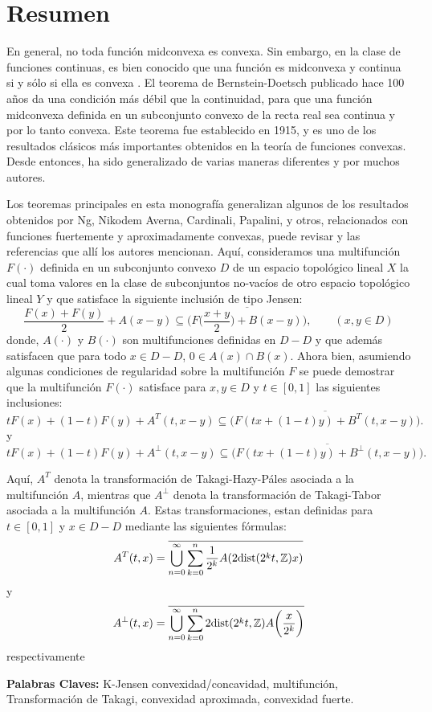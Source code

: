 \chapter*{Resumen}


En general, no toda función midconvexa es convexa. Sin embargo, en la clase de  
funciones continuas, es bien conocido que una función es midconvexa y continua si 
y sólo si ella es convexa \cite{Kuc09}. El teorema de Bernstein-Doetsch publicado hace 100 años da una condición
más débil que la continuidad, para que una función midconvexa definida en un subconjunto
convexo de la recta real sea continua y por lo tanto convexa. 
Este teorema fue establecido en 1915, y es uno de los resultados clásicos más importantes 
obtenidos en la teoría de funciones convexas. Desde entonces, ha sido generalizado de varias 
maneras diferentes y por muchos autores. 

Los teoremas principales en esta monografía generalizan algunos de los resultados obtenidos por Ng, Nikodem
Averna, Cardinali, Papalini, y otros, relacionados con funciones fuertemente y aproximadamente convexas,
puede revisar \cite{MakPal10b,MakPal13b,Nik89} y las referencias que allí los autores mencionan.
Aquí, consideramos una multifunción $F(\cdot)$ definida en un subconjunto convexo $D$ de
un espacio topológico lineal $X$ la cual toma valores en la clase de subconjuntos no-vacíos 
de otro espacio topológico lineal $Y$ y que satisface la siguiente inclusión de tipo Jensen:
$$
\frac{F(x)+F(y)}2 + A(x-y) \subseteq \overline{\bigg(F\bigg(\frac{x+y}2\bigg)+B(x-y)\bigg)},
\qquad
(x,y\in D)
$$
donde, $A(\cdot)$ y $B(\cdot)$ son multifunciones definidas en $D-D$ y que además satisfacen que para todo $x\in D-D$,
$0\in A(x)\cap B(x)$. Ahora bien, asumiendo algunas condiciones de regularidad sobre la multifunción $F$  
se puede demostrar que la multifunción $F(\cdot)$ satisface para $x,y\in D$ y $t\in[0,1]$
las siguientes inclusiones:
$$
tF(x)+(1-t)F(y) + A^T(t,x-y) \subseteq \overline{\bigg(F(tx+(1-t)y)+B^T(t,x-y)\bigg)}.
$$
y
$$
tF(x)+(1-t)F(y) + A^\perp(t,x-y) \subseteq \overline{\bigg(F(tx+(1-t)y)+B^\perp(t,x-y)\bigg)}.
$$

Aquí, $A^T$ denota la transformación de Takagi-Hazy-P\'ales asociada a la multifunción $A$, 
mientras que $A^\perp$ denota la transformaci\'on de Takagi-Tabor asociada a la multifunci\'on
$A$. Estas transformaciones, estan definidas para 
 $t\in[0,1]$ y $x\in D- D$ mediante las siguientes fórmulas:
$$
A^T(t,x) = \overline{\bigcup_{n=0}^{\infty}\sum_{k=0}^n{\frac1{2^k}A(2\mbox{dist}(2^kt,\mathbb{Z})x)}}
$$
y
$$
A^\perp(t,x) = \overline{\bigcup_{n=0}^{\infty}\sum_{k=0}^n{2\mbox{dist}(2^kt,\mathbb{Z})A\bigg(\frac{x}{2^k}\bigg)}}
$$
respectivamente

{\bf Palabras Claves:} K-Jensen convexidad/concavidad, multifunción, Transformación de Takagi, convexidad aproximada,
convexidad fuerte.